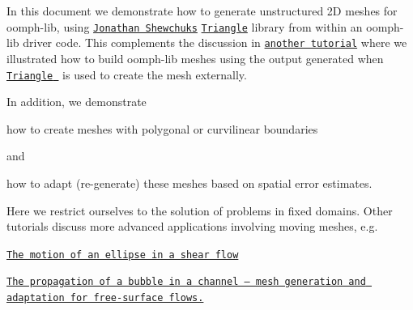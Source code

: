 In this document we demonstrate how to generate unstructured 2D meshes for {\ttfamily oomph-\/lib}, using \href{http://www.cs.berkeley.edu/~jrs/}{\tt Jonathan Shewchuk\textquotesingle{}s} \href{http://www.cs.cmu.edu/~quake/triangle.html}{\tt Triangle} library from within an {\ttfamily oomph-\/lib} driver code. This complements the discussion in \href{../../../../doc/meshes/mesh_from_triangle/html/index.html}{\tt another tutorial} where we illustrated how to build {\ttfamily oomph-\/lib} meshes using the output generated when \href{http://www.cs.cmu.edu/~quake/triangle.html}{\tt {\ttfamily Triangle} } is used to create the mesh externally.

In addition, we demonstrate
\begin{DoxyItemize}
\item how to create meshes with polygonal or curvilinear boundaries
\end{DoxyItemize}and
\begin{DoxyItemize}
\item how to adapt (re-\/generate) these meshes based on spatial error estimates.
\end{DoxyItemize}Here we restrict ourselves to the solution of problems in fixed domains. Other tutorials discuss more advanced applications involving moving meshes, e.\+g.
\begin{DoxyItemize}
\item \href{../../../../doc/navier_stokes/jeffery_orbit/html/index.html}{\tt The motion of an ellipse in a shear flow} ~\newline
~\newline

\item \href{../../../../doc/navier_stokes/adaptive_bubble_in_channel/html/index.html}{\tt The propagation of a bubble in a channel -- mesh generation and adaptation for free-\/surface flows.} ~\newline
~\newline

\end{DoxyItemize}

 

